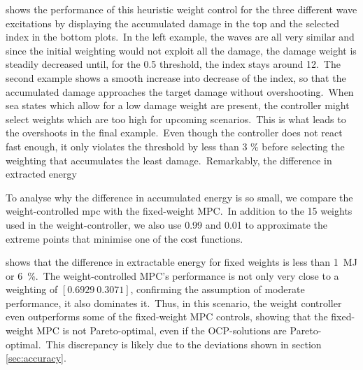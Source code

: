 shows the performance of this heuristic weight control for the three different wave excitations by displaying the accumulated damage in the top and the selected index in the bottom plots.\ 
In the left example, the waves are all very similar and since the initial weighting would not exploit all the damage, the damage weight is steadily decreased until, for the 0.5 threshold, the index stays around 12.\
The second example shows a smooth increase into decrease of the index, so that the accumulated damage approaches the target damage without overshooting.\ 
When sea states which allow for a low damage weight are present, the controller might select weights which are too high for upcoming scenarios.\ 
This is what leads to the overshoots in the final example.\ 
Even though the controller does not react fast enough, it only violates the threshold by less than 3 \% before selecting the weighting that accumulates the least damage.\ 
Remarkably, the difference in extracted energy

To analyse why the difference in accumulated energy is so small, we compare the weight-controlled \ac{mpc} with the fixed-weight MPC.\ 
In addition to the 15 weights used in the weight-controller, we also use 0.99 and 0.01 to approximate the extreme points that minimise one of the cost functions.\ 

\figref{fig:mpc_pf} shows that the difference in extractable energy for fixed weights is less than \SI{1}{\mega\joule} or \SI{6}{\percent}.\ 
The weight-controlled MPC's performance is not only very close to a weighting of $[0.6929 \ 0.3071]$, confirming the assumption of moderate performance, it also dominates it.\ 
Thus, in this scenario, the weight controller even outperforms some of the fixed-weight MPC controls, showing that the fixed-weight MPC is not Pareto-optimal, even if the OCP-solutions are Pareto-optimal.\ 
This discrepancy is likely due to the deviations shown in section \ref{sec:accuracy}.
